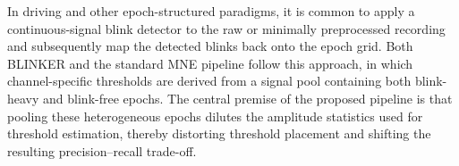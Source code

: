In driving and other epoch-structured paradigms, it is common to apply a continuous-signal blink detector to the raw or minimally preprocessed recording and subsequently map the detected blinks back onto the epoch grid. Both BLINKER and the standard MNE pipeline follow this approach, in which channel-specific thresholds are derived from a signal pool containing both blink-heavy and blink-free epochs. The central premise of the proposed pipeline is that pooling these heterogeneous epochs dilutes the amplitude statistics used for threshold estimation, thereby distorting threshold placement and shifting the resulting precision--recall trade-off.

